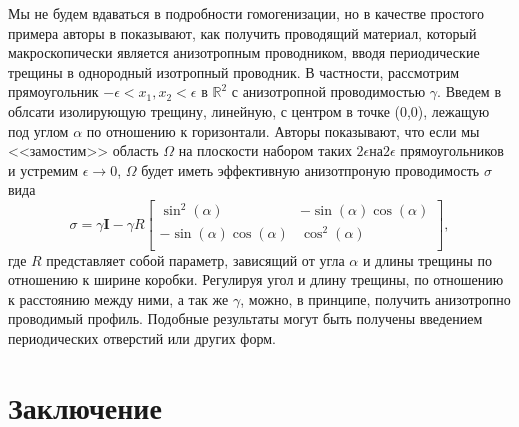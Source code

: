 \documentclass[a4paper, 12pt]{article}
\begin{document}
Мы не будем вдаваться в подробности гомогенизации, но в качестве простого примера 
авторы в \cite{b3} показывают, как получить проводящий материал, который 
макроскопически является анизотропным проводником, вводя периодические трещины
в однородный изотропный проводник. В частности, рассмотрим прямоугольник $-\epsilon < 
x_1,x_2<\epsilon$ в $\mathbb{R}^2$ с анизотропной проводимостью $\gamma$. Введем в 
облсати изолирующую трещину, линейную, с центром в точке (0,0), лежащую под углом 
$\alpha$ по отношению к горизонтали. Авторы \cite{b3} показывают, что если мы 
<<замостим>> область $\Omega$ на плоскости набором таких $2\epsilon \text{на}
2\epsilon$ прямоугольников и устремим $\epsilon \to 0$, $\Omega$ будет иметь
эффективную анизотпроную проводимость $\sigma$ вида
\begin{equation*}
\sigma = \gamma \textbf{I}-\gamma R
 \begin{bmatrix}
  \sin^2(\alpha) & -\sin(\alpha)\cos(\alpha) \\
  -\sin(\alpha)\cos(\alpha) & \cos^2(\alpha) \\
 \end{bmatrix},
\end{equation*}
где $R$ представляет собой параметр, зависящий от угла $\alpha$ и длины трещины по
отношению к ширине коробки. Регулируя угол и длину трещины, по отношению к расстоянию
между ними, а так же $\gamma$, можно, в принципе, получить анизотропно проводимый 
профиль. Подобные результаты могут быть получены введением периодических отверстий
или других форм.

\section{Заключение} 
\end{document}
